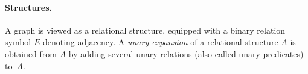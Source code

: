 \paragraph{Structures.}
A graph is viewed as a relational structure, equipped with a binary relation symbol $E$ denoting adjacency.
A \emph{unary expansion} of a relational structure $A$ is obtained from $A$ by 
adding several unary relations (also called unary predicates) to~$A$.








